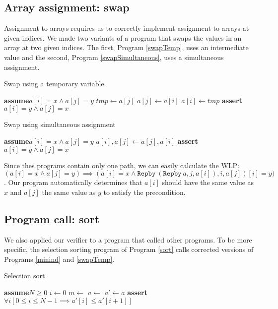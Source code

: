 \documentclass[a4paper]{article}
\newcommand{\Assert}{\State\textbf{assert}\xspace}
\newcommand{\Assume}{\State\textbf{assume}\xspace}
\begin{document}
\subsection{Array assignment: swap}

Assignment to arrays requires us to correctly implement assignment to arrays at given indices. We made two variants of a program that swaps the values in an array at two given indices. The first, Program \ref{swapTemp}, uses an intermediate value and the second, Program \ref{swapSimultaneous}, uses a simultaneous assignment.

\begin{algorithm}
\caption{Swap using a temporary variable} \label{swapTemp}
\begin{algorithmic}
\Assume $a[i] = x \wedge a[j] = y$
\State $\textit{tmp} \gets a[j]$
\State $a[j] \gets a[i]$
\State $a[i] \gets \textit{tmp}$
\EndVar
\Assert $a[i] = y \wedge a[j] = x$
\end{algorithmic}
\end{algorithm}

\begin{algorithm}
\caption{Swap using simultaneous assignment}
\label{swapSimultaneous}
\begin{algorithmic}
\Assume $a[i] = x \wedge a[j] = y$
\State $a[i], a[j] \gets a[j], a[i]$
\Assert $a[i] = y \wedge a[j] = x$
\end{algorithmic}
\end{algorithm}

Since thes programs contain only one path, we can easily calculate the WLP: $(a[i] = x \wedge a[j] = y) \implies (a[i] = x \wedge \texttt{Repby}\ (\texttt{Repby}\ a, j, a[i]), i, a[j])[i] = y)$. Our program automatically determines that $a[i]$ should have the same value as $x$ and $a[j]$ the same value as $y$ to satisfy the precondition.

\subsection{Program call: sort}

We also applied our verifier to a program that called other programs. To be more specific, the selection sorting program of Program \ref{sort} calls corrected versions of Programs \ref{minind} and \ref{swapTemp}.

\begin{algorithm}
\caption{Selection sort}
\label{sort}
\begin{algorithmic}
\Assume $N \geq 0$
	\State $i \gets 0$
		\State $m \gets $
			\State $a \gets $
		\EndIf
	\EndWhile
\EndVar
\State $a' \gets a$
\Assert $\forall i [0 \leq i \leq N-1 \implies a'[i] \leq a'[i+1]]$
\end{algorithmic}
\end{algorithm}
\end{document}
